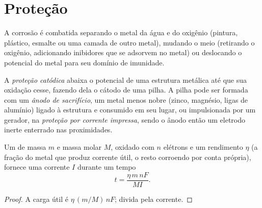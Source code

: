 \section{Proteção}

A corrosão é combatida separando o metal da água e do oxigênio (pintura,
plástico, esmalte ou uma camada de outro metal), mudando o meio (retirando o
oxigênio, adicionando inibidores que se adsorvem no metal) ou deslocando o
potencial do metal para seu domínio de imunidade.

\begin{definition}\label{def:b2:corrosion:protection}
A \emph{proteção catódica} abaixa o potencial de uma
estrutura metálica até que sua oxidação cesse, fazendo dela o cátodo de uma
pilha. A pilha pode ser formada com um \emph{ânodo de sacrifício},
um metal menos nobre (zinco, magnésio, ligas de alumínio) ligado à
estrutura e consumido em seu lugar, ou impulsionada por um gerador, na
\emph{proteção por corrente impressa}, sendo o
ânodo então um eletrodo inerte enterrado nas proximidades.
\end{definition}

\begin{proposition}\label{prop:b2:corrosion:anode-life}
Um  de massa $m$ e massa molar $M$, oxidado com $n$ elétrons
e um rendimento $\eta$ (a fração do metal que produz corrente útil, o resto
corroendo por conta própria), fornece uma corrente $I$ durante um tempo
\[
  t = \frac{\eta\,m\,nF}{M I} .
\]
\end{proposition}

\begin{proof}
A carga útil é $\eta\,(m/M)\,nF$; divida pela corrente.
\end{proof}

